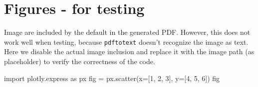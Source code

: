 \documentclass[oneside]{book}
\begin{document}
\chapter{Figures - for testing}

Image are included by the default in the generated PDF. However, this does not work well when testing, because \texttt{pdftotext} doesn't recognize the image as text. Here we disable the actual image inclusion and replace it with the image path (as placeholder) to verify the correctness of the code.

\begin{pycell}
import plotly.express as px
fig = px.scatter(x=[1, 2, 3], y=[4, 5, 6])
fig
\end{pycell}
\ifPythonTeXLoaded
{}
\else
\fi
\end{document}
